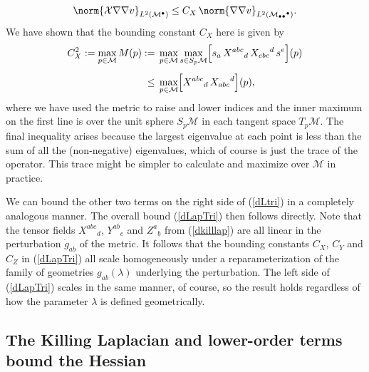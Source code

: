 \documentclass[12pt,letterpaper]{iopart}
\newcommand\M{\mathcal{M}}
\newcommand\X{\mathcal{X}}
\newcommand\ind{{\bullet}}
\begin{document}
%
\begin{equation}\label{Xbound}
	\norm{\X \grad \grad v}_{L^2(\M^\ind)} 
		\le C_X\, \norm{\grad \grad v}_{L^2(\M_{\ind\ind}{}^\ind)}.
\end{equation}
%
We have shown that the bounding constant $C_X$ here is given by  
%
\begin{align}\label{CXdef}
	C_X^2 := \max_{p \in \M} M(p)
		:={}&{} \max_{p \in \M} \max_{s \in S_p \M} \Bigl[ s_a\, X^{abc}{}_d\, X_{ebc}{}^d\, s^e \Bigr](p)
			\notag\\[1ex]
		\le{}&{} \max_{p \in \M} \Bigl[ X^{abc}{}_d\, X_{abc}{}^d \Bigr](p), 
\end{align}
%
where we have used the metric to raise and lower indices and the inner maximum on the first line is over the unit sphere $S_p \M$ in each tangent space $T_p \M$.  The final inequality arises because the largest eigenvalue at each point is less than the sum of all the (non-negative) eigenvalues, which of course is just the trace of the operator.  This trace might be simpler to calculate and maximize over $\M$ in practice.

We can bound the other two terms on the right side of (\ref{dLtri}) in a completely analogous manner.  The overall bound (\ref{dLapTri}) then follows directly.  Note that the tensor fields $X^{abc}{}_d$, $Y^{ab}{}_c$ and $Z^a{}_b$ from (\ref{dkilllap}) are all linear in the perturbation $\dot g_{ab}$ of the metric.  It follows that the bounding constants $C_X$, $C_Y$ and $C_Z$ in (\ref{dLapTri}) all scale homogeneously under a reparameterization of the family of geometries $g_{ab}(\lambda)$ underlying the perturbation.  The left side of (\ref{dLapTri}) scales in the same manner, of course, so the result holds regardless of how the parameter $\lambda$ is defined geometrically.


\subsection{The Killing Laplacian and lower-order terms bound the Hessian}
\label{Hess<Lap}
\end{document}
